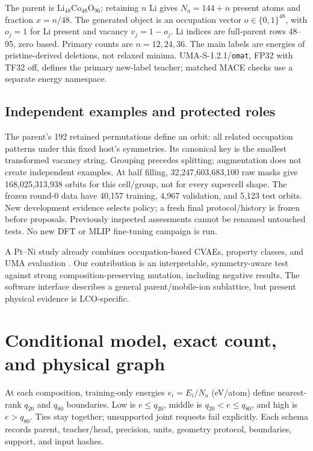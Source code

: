 \documentclass[10pt]{article}
\begin{document}
The parent is Li$_{48}$Co$_{48}$O$_{96}$; retaining $n$ Li gives $N_a=144+n$
present atoms and fraction $x=n/48$. The generated object is an occupation vector
$o\in\{0,1\}^{48}$, with $o_j=1$ for Li present and vacancy $v_j=1-o_j$.
Li indices are full-parent rows 48--95, zero based. Primary counts are
$n=12,24,36$. The main labels are energies of pristine-derived deletions, not
relaxed minima. UMA-S-1.2.1/\texttt{omat}, FP32 with TF32 off, defines the primary
new-label teacher; matched MACE checks use a separate energy namespace.

\subsection{Independent examples and protected roles}
The parent's 192 retained permutations define an orbit: all related occupation
patterns under this fixed host's symmetries. Its canonical key is the smallest
transformed vacancy string. Grouping precedes splitting; augmentation does not
create independent examples. At half filling, 32,247,603,683,100 raw masks give
168,025,313,938 orbits for this cell/group, not for every supercell shape.
The frozen round-0 data have 40,157 training, 4,967 validation, and 5,123 test
orbits. New development evidence selects policy; a fresh final protocol/history
is frozen before proposals. Previously inspected assessments cannot be renamed
untouched tests. No new DFT or MLIP fine-tuning campaign is run.

A Pt--Ni study already combines occupation-based CVAEs, property classes, and
UMA evaluation \cite{wakamiya2026}. Our contribution is an interpretable,
symmetry-aware test against strong composition-preserving mutation, including
negative results. The software interface describes a general parent/mobile-ion
sublattice, but present physical evidence is LCO-specific.
\newpage

\section{Conditional model, exact count, and physical graph}
At each composition, training-only energies $e_i=E_i/N_a$ (eV/atom) define nearest-
rank $q_{20}$ and $q_{80}$ boundaries. Low is $e\le q_{20}$, middle is
$q_{20}<e\le q_{80}$, and high is $e>q_{80}$. Ties stay together; unsupported
joint requests fail explicitly. Each schema records parent, teacher/head,
precision, units, geometry protocol, boundaries, support, and input hashes.
\end{document}
